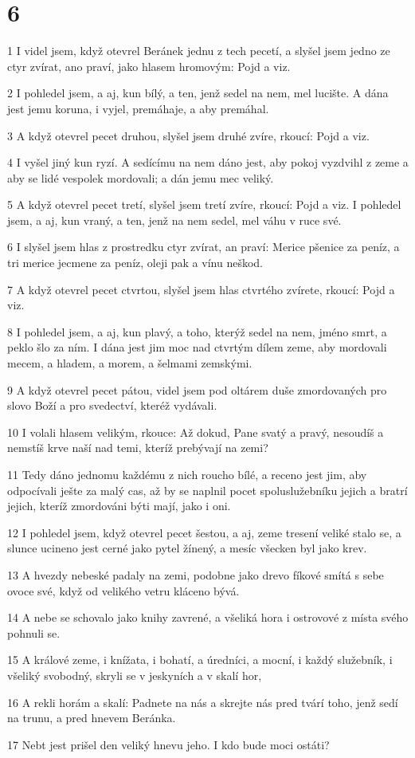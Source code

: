 \chapter{6}

\par 1 I videl jsem, když otevrel Beránek jednu z tech pecetí, a slyšel jsem jedno ze ctyr zvírat, ano praví, jako hlasem hromovým: Pojd a viz.
\par 2 I pohledel jsem, a aj, kun bílý, a ten, jenž sedel na nem, mel lucište. A dána jest jemu koruna, i vyjel, premáhaje, a aby premáhal.
\par 3 A když otevrel pecet druhou, slyšel jsem druhé zvíre, rkoucí: Pojd a viz.
\par 4 I vyšel jiný kun ryzí. A sedícímu na nem dáno jest, aby pokoj vyzdvihl z zeme a aby se lidé vespolek mordovali; a dán jemu mec veliký.
\par 5 A když otevrel pecet tretí, slyšel jsem tretí zvíre, rkoucí: Pojd a viz. I pohledel jsem, a aj, kun vraný, a ten, jenž na nem sedel, mel váhu v ruce své.
\par 6 I slyšel jsem hlas z prostredku ctyr zvírat, an praví: Merice pšenice za peníz, a tri merice jecmene za peníz, oleji pak a vínu neškod.
\par 7 A když otevrel pecet ctvrtou, slyšel jsem hlas ctvrtého zvírete, rkoucí: Pojd a viz.
\par 8 I pohledel jsem, a aj, kun plavý, a toho, kterýž sedel na nem, jméno smrt, a peklo šlo za ním. I dána jest jim moc nad ctvrtým dílem zeme, aby mordovali mecem, a hladem, a morem, a šelmami zemskými.
\par 9 A když otevrel pecet pátou, videl jsem pod oltárem duše zmordovaných pro slovo Boží a pro svedectví, kteréž vydávali.
\par 10 I volali hlasem velikým, rkouce: Až dokud, Pane svatý a pravý, nesoudíš a nemstíš krve naší nad temi, kteríž prebývají na zemi?
\par 11 Tedy dáno jednomu každému z nich roucho bílé, a receno jest jim, aby odpocívali ješte za malý cas, až by se naplnil pocet spoluslužebníku jejich a bratrí jejich, kteríž zmordováni býti mají, jako i oni.
\par 12 I pohledel jsem, když otevrel pecet šestou, a aj, zeme tresení veliké stalo se, a slunce ucineno jest cerné jako pytel žínený, a mesíc všecken byl jako krev.
\par 13 A hvezdy nebeské padaly na zemi, podobne jako drevo fíkové smítá s sebe ovoce své, když od velikého vetru kláceno bývá.
\par 14 A nebe se schovalo jako knihy zavrené, a všeliká hora i ostrovové z místa svého pohnuli se.
\par 15 A králové zeme, i knížata, i bohatí, a úredníci, a mocní, i každý služebník, i všeliký svobodný, skryli se v jeskyních a v skalí hor,
\par 16 A rekli horám a skalí: Padnete na nás a skrejte nás pred tvárí toho, jenž sedí na trunu, a pred hnevem Beránka.
\par 17 Nebt jest prišel den veliký hnevu jeho. I kdo bude moci ostáti?

